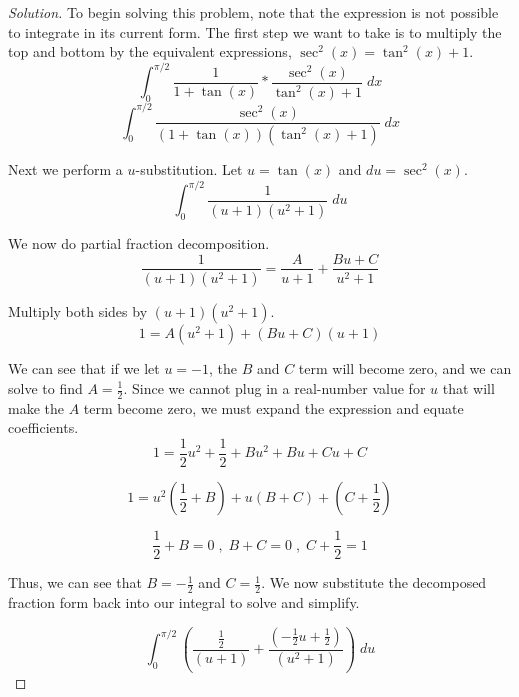\documentclass[letterpaper,12pt]{amsart}
\newenvironment{solution}
  {\begin{proof}[Solution]}
  {\end{proof}}
\begin{document}
\begin{solution}  %
To begin solving this problem, note that the expression is not possible to integrate in its current form. The first step we want to take is to multiply the top and bottom by the equivalent expressions, $\sec^2(x) = \tan^2(x) + 1$.\newline
\[
\int_0^{\pi/2} \frac{1}{1+\tan(x)} * \frac{\sec^2(x)}{\tan^2(x) + 1}\;dx
\]
\vspace*{0.15cm}
\[
\int_0^{\pi/2} \frac{\sec^2(x)}{(1 + \tan(x))(\tan^2(x) + 1)}\;dx
\]

\vspace*{0.45cm} Next we perform a $u$-substitution. Let $u = \tan(x)$ and $du = \sec^2(x)$.\newline
\[
\int_0^{\pi/2} \frac{1}{(u+1)(u^2 +1)}\;du
\]

\vspace*{0.45cm} We now do partial fraction decomposition.\newline
\[
\frac{1}{(u+1)(u^2+1)} = \frac{A}{u+1} + \frac{Bu+C}{u^2+1}
\]

\vspace*{0.45cm} Multiply both sides by $(u+1)(u^2+1)$.\newline
\[
1 = A(u^2+1) + (Bu + C)(u+1)
\]

\vspace*{0.45cm} We  can see that if we let $u = -1$, the $B$ and $C$ term will become zero, and we can solve to find $A = \frac{1}{2}$. Since we cannot plug in a real-number value for $u$ that will make the $A$ term become zero, we must expand the expression and equate coefficients.\newline
\[
1 = \frac{1}{2}u^2 + \frac{1}{2} + Bu^2 + Bu + Cu + C
\]

\vspace*{0.15cm}
\[
1 = u^2(\frac{1}{2} + B) + u(B+C) + (C + \frac{1}{2})
\]

\vspace*{0.15cm}
\[
\frac{1}{2} + B = 0 \;,\; B+C = 0 \;,\; C + \frac{1}{2} = 1 
\]

\vspace*{0.45cm} Thus, we can see that $B = -\frac{1}{2}$ and $C = \frac{1}{2}$. We now substitute the decomposed fraction form back into our integral to solve and simplify.\newline

\[
\int_0^{\pi/2} \left(\frac{\frac{1}{2}}{(u+1)} + \frac{(-\frac{1}{2}u + \frac{1}{2})}{(u^2+1)}\right)\;du
\]


\end{solution}
\end{document}
